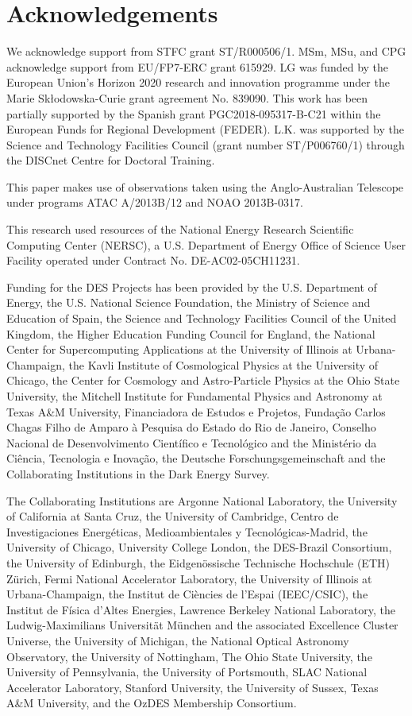 \documentclass[fleqn,usenatbib,]{mnras}
\begin{document}
\section*{Acknowledgements}

We acknowledge support from STFC grant ST/R000506/1. MSm, MSu, and CPG acknowledge support from EU/FP7-ERC grant 615929. LG was funded by the European Union's Horizon 2020 research and innovation programme under the Marie Sk\l{}odowska-Curie grant agreement No. 839090. This work has been partially supported by the Spanish grant PGC2018-095317-B-C21 within the European Funds for Regional Development (FEDER). L.K. was supported by the Science and Technology Facilities Council (grant number ST/P006760/1) through the DISCnet Centre for Doctoral Training.

This paper makes use of observations taken using the Anglo-Australian Telescope under programs ATAC A/2013B/12 and NOAO 2013B-0317.

This research used resources of the National Energy Research Scientific Computing Center (NERSC), a U.S. Department of Energy Office of Science User Facility operated under Contract No. DE-AC02-05CH11231.

Funding for the DES Projects has been provided by the U.S. Department of Energy, the U.S. National Science Foundation, the Ministry of Science and Education of Spain, 
the Science and Technology Facilities Council of the United Kingdom, the Higher Education Funding Council for England, the National Center for Supercomputing 
Applications at the University of Illinois at Urbana-Champaign, the Kavli Institute of Cosmological Physics at the University of Chicago, 
the Center for Cosmology and Astro-Particle Physics at the Ohio State University,
the Mitchell Institute for Fundamental Physics and Astronomy at Texas A\&M University, Financiadora de Estudos e Projetos, 
Funda{\c c}{\~a}o Carlos Chagas Filho de Amparo {\`a} Pesquisa do Estado do Rio de Janeiro, Conselho Nacional de Desenvolvimento Cient{\'i}fico e Tecnol{\'o}gico and 
the Minist{\'e}rio da Ci{\^e}ncia, Tecnologia e Inova{\c c}{\~a}o, the Deutsche Forschungsgemeinschaft and the Collaborating Institutions in the Dark Energy Survey. 

The Collaborating Institutions are Argonne National Laboratory, the University of California at Santa Cruz, the University of Cambridge, Centro de Investigaciones Energ{\'e}ticas, 
Medioambientales y Tecnol{\'o}gicas-Madrid, the University of Chicago, University College London, the DES-Brazil Consortium, the University of Edinburgh, 
the Eidgen{\"o}ssische Technische Hochschule (ETH) Z{\"u}rich, 
Fermi National Accelerator Laboratory, the University of Illinois at Urbana-Champaign, the Institut de Ci{\`e}ncies de l'Espai (IEEC/CSIC), 
the Institut de F{\'i}sica d'Altes Energies, Lawrence Berkeley National Laboratory, the Ludwig-Maximilians Universit{\"a}t M{\"u}nchen and the associated Excellence Cluster Universe, 
the University of Michigan, the National Optical Astronomy Observatory, the University of Nottingham, The Ohio State University, the University of Pennsylvania, the University of Portsmouth, 
SLAC National Accelerator Laboratory, Stanford University, the University of Sussex, Texas A\&M University, and the OzDES Membership Consortium.
\end{document}
